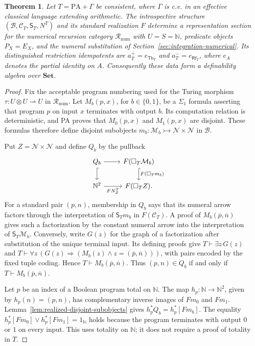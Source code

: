 \documentclass[11pt]{article}
\newtheorem{theorem}{Theorem}[section]
\theoremstyle{definition}
\theoremstyle{remark}
\begin{document}
\begin{theorem}\label{thm:introspection-numerical-definability}
Let $T=\mathrm{PA}+\Gamma$ be consistent, where $\Gamma$ is c.e.
in an effective classical language extending arithmetic.
The introspective structure
$(\mathcal B,\mathcal C_T,\mathsf S_T,N^T)$ and its standard
realization $F$ determine a representation section for the
numerical recursion category $\mathcal R_{\mathrm{num}}$ with
$U=S=\mathbb N$, predicate objects $P_X=E_X$, and the numeral
substitution of Section~\ref{sec:integration-numerical}. Its distinguished
restriction idempotents are $a_T^+=e_{\mathsf{Th}_T}$ and $a_T^-=e_{\mathsf{Rf}_T}$,
where $e_A$ denotes the partial identity on $A$.
Consequently these data form a definability algebra over
$\mathbf{Set}$.
\end{theorem}
\begin{proof}
Fix the acceptable program numbering used for the Turing
morphism $\tau:U\otimes U\rightharpoonup U$ in
$\mathcal R_{\mathrm{num}}$.
Let $M_b(p,x)$, for $b\in\{0,1\}$, be a $\Sigma_1$ formula
asserting that program $p$ on input $x$ terminates with output
$b$. Its computation relation is deterministic, and PA proves
that $M_0(p,x)$ and $M_1(p,x)$ are disjoint.
These formulas therefore define disjoint subobjects
$m_b:\mathcal M_b\rightarrowtail\mathcal N\times\mathcal N$
in $\mathcal B$.

Put $Z=\mathcal N\times\mathcal N$ and define $Q_b$ by the
pullback
\[
\begin{tikzcd}
 Q_b \arrow[r] \arrow[d,hook]
   & F(\Box_T\mathcal M_b) \arrow[d,hook,"F(\Box_Tm_b)"]\\
 \mathbb N^2 \arrow[r,"FN^T_Z"'] & F(\Box_TZ).
\end{tikzcd}
\]
For a standard pair $(p,n)$, membership in $Q_b$ says that its
numeral arrow factors through the interpretation of $\mathsf S_Tm_b$
in $F(\mathcal C_T)$. A proof of $M_b(\overline p,\overline n)$
gives such a factorization by the constant numeral arrow into
the interpretation of $\mathsf S_T\mathcal M_b$.
Conversely, write $G(z)$ for the graph of a factorization after
substitution of the unique terminal input. Its defining proofs give
$T\vdash\exists z\,G(z)$ and
$T\vdash\forall z\,(G(z)\Rightarrow
(M_b(z)\wedge z=(\overline p,\overline n)))$, with pairs
encoded by the fixed tuple coding. Hence
$T\vdash M_b(\overline p,\overline n)$.
Thus $(p,n)\in Q_b$ if and only if
$T\vdash M_b(\overline p,\overline n)$.

Let $p$ be an index of a Boolean program total on $\mathbb N$. The map
$h_p:\mathbb N\to\mathbb N^2$, given by $h_p(n)=(p,n)$, has
complementary inverse images of $Fm_0$ and $Fm_1$.
Lemma~\ref{lem:realized-disjoint-subobjects} gives
$h_p^*Q_b=h_p^*[Fm_b]$.
The equality $h_p^*[Fm_0]\vee h_p^*[Fm_1]=1_{\mathbb N}$ holds
because the program terminates with output $0$ or $1$ on every input.
This uses totality on $\mathbb N$; it does not require a proof of totality in $T$.


\end{proof}
\end{document}
